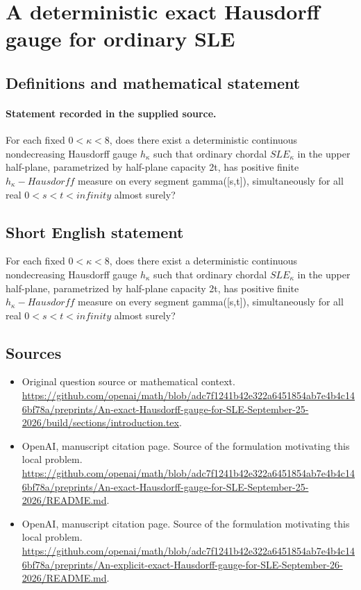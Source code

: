 \documentclass[11pt]{article}
\begin{document}
\section*{A deterministic exact Hausdorff gauge for ordinary SLE}\label{statement}
\subsection{Definitions and mathematical statement}
\paragraph{Statement recorded in the supplied source.}
For each fixed $0<\kappa <8$, does there exist a deterministic continuous nondecreasing Hausdorff gauge $h_\kappa $ such that ordinary chordal $SLE_\kappa $ in the upper half-plane, parametrized by half-plane capacity 2t, has positive finite $h_\kappa -Hausdorff$ measure on every segment gamma([s,t]), simultaneously for all real $0<s<t<infinity$ almost surely?
\subsection{Short English statement}
For each fixed $0<\kappa <8$, does there exist a deterministic continuous nondecreasing Hausdorff gauge $h_\kappa $ such that ordinary chordal $SLE_\kappa $ in the upper half-plane, parametrized by half-plane capacity 2t, has positive finite $h_\kappa -Hausdorff$ measure on every segment gamma([s,t]), simultaneously for all real $0<s<t<infinity$ almost surely?
\subsection{Sources}
\begin{itemize}
\item[S1] Original question source or mathematical context.
\url{https://github.com/openai/math/blob/adc7f1241b42e322a6451854ab7e4b4c146bf78a/preprints/An-exact-Hausdorff-gauge-for-SLE-September-25-2026/build/sections/introduction.tex}.
\item[S2] OpenAI, manuscript citation page. Source of the formulation motivating this local problem.
\url{https://github.com/openai/math/blob/adc7f1241b42e322a6451854ab7e4b4c146bf78a/preprints/An-exact-Hausdorff-gauge-for-SLE-September-25-2026/README.md}.
\item[S3] OpenAI, manuscript citation page. Source of the formulation motivating this local problem.
\url{https://github.com/openai/math/blob/adc7f1241b42e322a6451854ab7e4b4c146bf78a/preprints/An-explicit-exact-Hausdorff-gauge-for-SLE-September-26-2026/README.md}.
\end{itemize}
\end{document}
